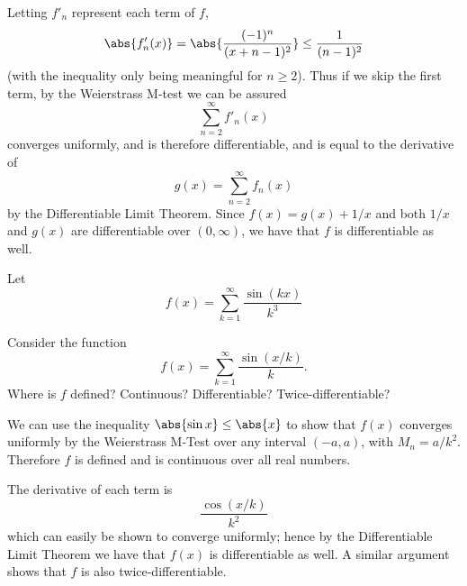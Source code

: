 Letting \(f'_n\) represent each term of \(f\),
\[\abs{f'_n(x)} = \abs{\frac{(-1)^{n}}{(x+n - 1)^2}} \leq \frac{1}{(n-1)^2}\]
(with the inequality only being meaningful for \(n \geq 2\)). Thus if we skip the first term, by the Weierstrass M-test we can be assured
\[\sum^\infty_{n=2}f'_n(x)\]
converges uniformly, and is therefore differentiable, and is equal to the derivative of
\[g(x) = \sum^\infty_{n=2}f_n(x)\]
by the Differentiable Limit Theorem. Since \(f(x) = g(x) + 1/x\) and both \(1/x\) and \(g(x)\) are differentiable over \((0, \infty)\), we have that \(f\) is differentiable as well.
\begin{exercise}
  Let
  $$
  f(x)=\sum_{k=1}^{\infty} \frac{\sin (k x)}{k^{3}}
  $$
\end{exercise}
\begin{solution}
\end{solution}
\begin{exercise}
  Consider the function
  $$
  f(x)=\sum_{k=1}^{\infty} \frac{\sin (x / k)}{k} .
  $$
  Where is $f$ defined? Continuous? Differentiable? Twice-differentiable?
\end{exercise}
\begin{solution}
  We can use the inequality \(\abs{\sin{x}} \leq \abs{x} \) to show that \(f(x)\) converges uniformly by the Weierstrass M-Test over any interval \((-a, a)\), with \(M_n = a/k^2\). Therefore \(f\) is defined and is continuous over all real numbers.

The derivative of each term is
\[\frac{\cos(x/k)}{k^2}\]
which can easily be shown to converge uniformly; hence by the Differentiable Limit Theorem we have that \(f(x)\) is differentiable as well. A similar argument shows that \(f\) is also twice-differentiable.
\end{solution}

